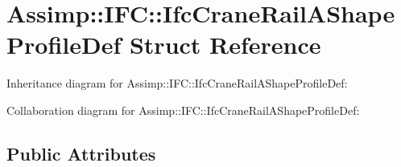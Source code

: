 \hypertarget{struct_assimp_1_1_i_f_c_1_1_ifc_crane_rail_a_shape_profile_def}{\section{Assimp\+:\+:I\+F\+C\+:\+:Ifc\+Crane\+Rail\+A\+Shape\+Profile\+Def Struct Reference}
\label{struct_assimp_1_1_i_f_c_1_1_ifc_crane_rail_a_shape_profile_def}
}


Inheritance diagram for Assimp\+:\+:I\+F\+C\+:\+:Ifc\+Crane\+Rail\+A\+Shape\+Profile\+Def\+:


Collaboration diagram for Assimp\+:\+:I\+F\+C\+:\+:Ifc\+Crane\+Rail\+A\+Shape\+Profile\+Def\+:
\subsection*{Public Attributes}
